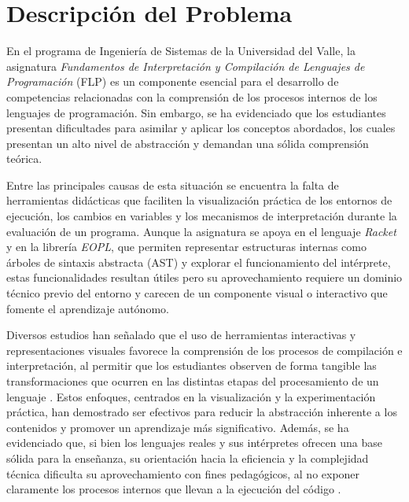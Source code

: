 \section{Descripción del Problema}

En el programa de Ingeniería de Sistemas de la Universidad del Valle, la asignatura \textit{Fundamentos de Interpretación y Compilación de Lenguajes de Programación} (FLP) es un componente esencial para el desarrollo de competencias relacionadas con la comprensión de los procesos internos de los lenguajes de programación. Sin embargo, se ha evidenciado que los estudiantes presentan dificultades para asimilar y aplicar los conceptos abordados, los cuales presentan un alto nivel de abstracción y demandan una sólida comprensión teórica.

Entre las principales causas de esta situación se encuentra la falta de herramientas didácticas que faciliten la visualización práctica de los entornos de ejecución, los cambios en variables y los mecanismos de interpretación durante la evaluación de un programa. Aunque la asignatura se apoya en el lenguaje \textit{Racket} y en la librería \textit{EOPL}, que permiten representar estructuras internas como árboles de sintaxis abstracta (AST) y explorar el funcionamiento del intérprete, estas funcionalidades resultan útiles pero su aprovechamiento requiere un dominio técnico previo del entorno y carecen de un componente visual o interactivo que fomente el aprendizaje autónomo.

Diversos estudios han señalado que el uso de herramientas interactivas y representaciones visuales favorece la comprensión de los procesos de compilación e interpretación, al permitir que los estudiantes observen de forma tangible las transformaciones que ocurren en las distintas etapas del procesamiento de un lenguaje \cite{Stamenković2024AWE, Mernik2003AnET, Vegdahl2000UsingVT, Kundra2016AnER}. Estos enfoques, centrados en la visualización y la experimentación práctica, han demostrado ser efectivos para reducir la abstracción inherente a los contenidos y promover un aprendizaje más significativo. Además, se ha evidenciado que, si bien los lenguajes reales y sus intérpretes ofrecen una base sólida para la enseñanza, su orientación hacia la eficiencia y la complejidad técnica dificulta su aprovechamiento con fines pedagógicos, al no exponer claramente los procesos internos que llevan a la ejecución del código \cite{Spigariol2023Aprendiendo}.

